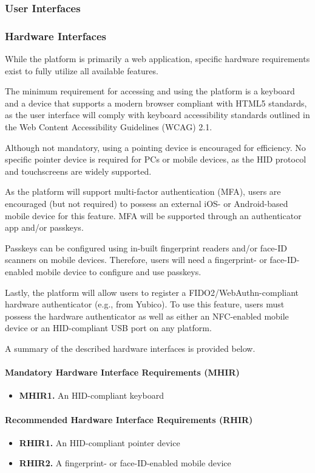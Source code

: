 \subsubsection{User Interfaces}
\subsubsection{Hardware Interfaces}
While the platform is primarily a web application, specific hardware requirements exist to fully utilize all available features.

The minimum requirement for accessing and using the platform is a keyboard and a device that supports a modern browser compliant with HTML5 standards, as the user interface will comply with keyboard accessibility standards outlined in the Web Content Accessibility Guidelines (WCAG) 2.1.

Although not mandatory, using a pointing device is encouraged for efficiency. No specific pointer device is required for PCs or mobile devices, as the HID protocol and touchscreens are widely supported.

As the platform will support multi-factor authentication (MFA), users are encouraged (but not required) to possess an external iOS- or Android-based mobile device for this feature. MFA will be supported through an authenticator app and/or passkeys.

Passkeys can be configured using in-built fingerprint readers and/or face-ID scanners on mobile devices. Therefore, users will need a fingerprint- or face-ID-enabled mobile device to configure and use passkeys.

Lastly, the platform will allow users to register a FIDO2/WebAuthn-compliant hardware authenticator (e.g., from Yubico). To use this feature, users must possess the hardware authenticator as well as either an NFC-enabled mobile device or an HID-compliant USB port on any platform.

A summary of the described hardware interfaces is provided below.

\paragraph{Mandatory Hardware Interface Requirements (MHIR)}
\begin{itemize}
    \item \textbf{MHIR1.} An HID-compliant keyboard
\end{itemize}

\paragraph{Recommended Hardware Interface Requirements (RHIR)}
\begin{itemize}
    \item \textbf{RHIR1.} An HID-compliant pointer device
    \item \textbf{RHIR2.} A fingerprint- or face-ID-enabled mobile device
\end{itemize}

